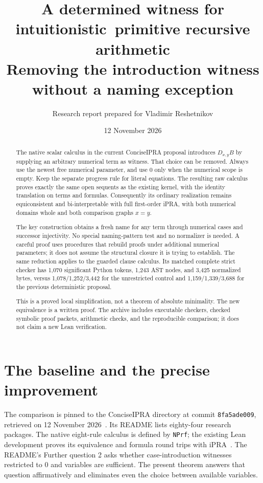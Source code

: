 \documentclass[11pt]{article}
\title{A determined witness for intuitionistic\ primitive recursive arithmetic\\[5pt]
\large Removing the introduction witness without a naming exception}
\author{Research report prepared for Vladimir Reshetnikov}
\date{12 November 2026}
\theoremstyle{definition}
\theoremstyle{remark}
\begin{document}
\maketitle
\begin{abstract}
The native scalar calculus in the current ConciseIPRA proposal introduces
$D_{x,y}B$ by supplying an arbitrary numerical term as witness. That choice
can be removed. Always use the newest free numerical parameter, and use
$0$ only when the numerical scope is empty. Keep the separate progress
rule for literal equations. The resulting raw calculus proves exactly the
same open sequents as the existing kernel, with the identity translation
on terms and formulas. Consequently its ordinary realization remains
equiconsistent and bi-interpretable with full first-order iPRA, with both
numerical domains whole and both comparison graphs $x=y$.

The key construction obtains a fresh name for any term through numerical
cases and successor injectivity. No special naming-pattern test and no
normalizer is needed. A careful proof uses procedures that rebuild proofs
under additional numerical parameters; it does not assume the structural
closure it is trying to establish. The same reduction applies to the
guarded clause calculus. Its matched complete strict checker has
1,070 significant Python tokens, 1,243 AST nodes, and 3,425 normalized
bytes, versus 1,078/1,252/3,442 for the unrestricted control and
1,159/1,339/3,688 for the previous deterministic proposal.

This is a proved local simplification, not a theorem of absolute minimality.
The new equivalence is a written proof. The archive includes executable
checkers, checked symbolic proof packets, arithmetic checks, and the
reproducible comparison; it does not claim a new Lean verification.
\end{abstract}
\tableofcontents
\newpage

\section{The baseline and the precise improvement}

The comparison is pinned to the ConciseIPRA directory at commit
\texttt{8fa5ade009}, retrieved on
12 November 2026~\cite{repository}. Its README lists eighty-four research
packages. The native eight-rule calculus is defined by \texttt{NPrf};
the existing Lean development proves its equivalence and formula round
trips with iPRA~\cite{native,biinterp}. The README's Further question 2
asks whether case-introduction witnesses restricted to $0$ and variables
are sufficient. The present theorem answers that question affirmatively
and eliminates even the choice between available variables.
\end{document}
